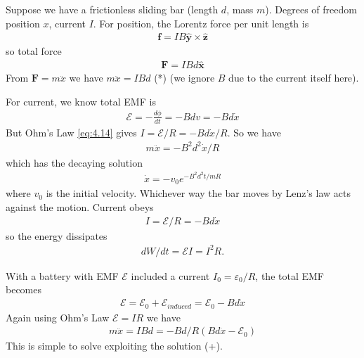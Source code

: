 \documentclass[a4paper]{article}
\begin{document}
Suppose we have a frictionless sliding bar (length $d$, mass $m$). Degrees of freedom position $x$, current $I$. For position, the Lorentz force per unit length is
\begin{equation*}
\begin{aligned}
\mathbf{f} = IB \mathbf{\hat{y}} \times \mathbf{\hat{z}}
\end{aligned}
\end{equation*}
so total force
\begin{equation*}
\begin{aligned}
\mathbf{F} = IB d\mathbf{\hat{x}}
\end{aligned}
\end{equation*}
From $\mathbf{F} = m\ddot{x}$ we have $m\ddot{x} = IBd$ (*) (we ignore $B$ due to the current itself here).

For current, we know total EMF is
\begin{equation*}
\begin{aligned}
\mathcal{E} = -\frac{d\phi}{dt} = -B dv = -B d \dot{x}
\end{aligned}
\end{equation*}
But Ohm's Law \eqref{eq:4.14} gives $I=\mathcal{E}/R = -Bd\dot{x}/R$. So we have
\begin{equation*}
\begin{aligned}
m \ddot{x} = -B^2 d^2 \dot{x}/R
\end{aligned}
\end{equation*}
which has the decaying solution
\begin{equation*}\tag{+}
\begin{aligned}
\dot{x} = -v_0 e^{-B^2d^2t/mR}
\end{aligned}
\end{equation*}
where $v_0$ is the initial velocity. Whichever way the bar moves by Lenz's law acts against the motion. Current obeys
\begin{equation*}
\begin{aligned}
I = \mathcal{E}/R = -Bd\dot{x}
\end{aligned}
\end{equation*}
so the energy dissipates 
\begin{equation*}\tag{4.17}
\begin{aligned}
dW/dt = \mathcal{E} I = I^2R.
\end{aligned}
\end{equation*}

With a battery with EMF $\mathcal{E}$ included a current $I_0 = \varepsilon_0/R$, the total EMF becomes
\begin{equation*}
\begin{aligned}
\mathcal{E} = \mathcal{E}_0 + \mathcal{E}_{induced} = \mathcal{E}_0 - Bd\dot{x}
\end{aligned}
\end{equation*}
Again using Ohm's Law $\mathcal{E} = IR$ we have
\begin{equation*}
\begin{aligned}
m \ddot{x} = IBd = -Bd/R(Bd\dot{x}-\mathcal{E}_0)
\end{aligned}
\end{equation*}
This is simple to solve exploiting the solution (+).
\end{document}
